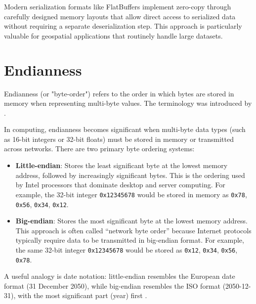Modern serialization formats like FlatBuffers implement zero-copy through carefully designed memory layouts that allow direct access to serialized data without requiring a separate deserialization step. This approach is particularly valuable for geospatial applications that routinely handle large datasets.
\section{Endianness}
\label{tb:endianness}
Endianness (or "byte-order") refers to the order in which bytes are stored in memory when representing multi-byte values. The terminology was introduced by \citet{danny_cohen_1981}.

In computing, endianness becomes significant when multi-byte data types (such as 16-bit integers or 32-bit floats) must be stored in memory or transmitted across networks. There are two primary byte ordering systems:

\begin{itemize}
  \item \textbf{Little-endian}: Stores the least significant byte at the lowest memory address, followed by increasingly significant bytes. This is the ordering used by Intel processors that dominate desktop and server computing. For example, the 32-bit integer \texttt{0x12345678} would be stored in memory as \texttt{0x78}, \texttt{0x56}, \texttt{0x34}, \texttt{0x12}.

  \item \textbf{Big-endian}: Stores the most significant byte at the lowest memory address. This approach is often called ``network byte order'' because Internet protocols typically require data to be transmitted in big-endian format. For example, the same 32-bit integer \texttt{0x12345678} would be stored as \texttt{0x12}, \texttt{0x34}, \texttt{0x56}, \texttt{0x78}.
\end{itemize}

A useful analogy is date notation: little-endian resembles the European date format (31 December 2050), while big-endian resembles the ISO format (2050-12-31), with the most significant part (year) first \citep{endianness_mdn}.



